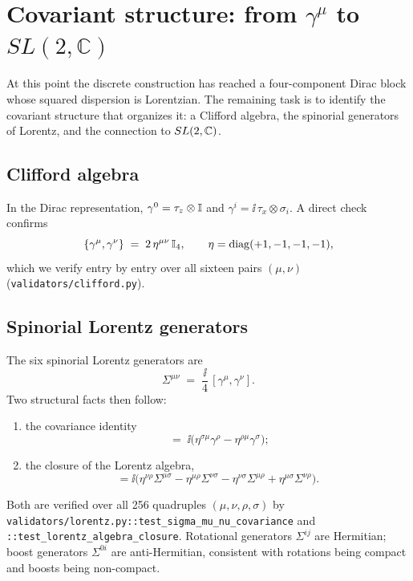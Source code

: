 \section{Covariant structure: from \texorpdfstring{$\gamma^{\mu}$}{gamma\^mu} to \texorpdfstring{$SL(2,\mathbb{C})$}{SL(2,C)}}
\label{p:covariant}

At this point the discrete construction has reached a four-component
Dirac block whose squared dispersion is Lorentzian. The remaining task
is to identify the covariant structure that organizes it: a Clifford
algebra, the spinorial generators of Lorentz, and the connection to
$SL(2,\mathbb{C})$.

\subsection{Clifford algebra}
In the Dirac representation, $\gamma^{0} = \tau_{z}\otimes\mathbb{I}$ and
$\gamma^{i} = \ii\,\tau_{x}\otimes\sigma_{i}$. A direct check confirms
\begin{equation}
\{\gamma^{\mu},\gamma^{\nu}\}\;=\;2\,\eta^{\mu\nu}\,\mathbb{I}_{4} ,
\qquad \eta=\mathrm{diag}(+1,-1,-1,-1) ,
\label{p:eq:clifford}
\end{equation}
which we verify entry by entry over all sixteen pairs $(\mu,\nu)$
(\texttt{validators/clifford.py}).

\subsection{Spinorial Lorentz generators}
The six spinorial Lorentz generators are
\begin{equation}
\Sigma^{\mu\nu} \;=\; \frac{\ii}{4}\,[\gamma^{\mu},\gamma^{\nu}] .
\end{equation}
Two structural facts then follow:
\begin{enumerate}[leftmargin=*]
\item the covariance identity
\begin{equation}
[\Sigma^{\rho\sigma},\,\gamma^{\mu}]
\;=\;\ii\bigl(\eta^{\sigma\mu}\gamma^{\rho}-\eta^{\rho\mu}\gamma^{\sigma}\bigr) ;
\label{p:eq:cov-id}
\end{equation}
\item the closure of the Lorentz algebra,
\begin{equation}
[\Sigma^{\mu\nu},\Sigma^{\rho\sigma}] = \ii\bigl(
  \eta^{\nu\rho}\Sigma^{\mu\sigma}-\eta^{\mu\rho}\Sigma^{\nu\sigma}
 -\eta^{\nu\sigma}\Sigma^{\mu\rho}+\eta^{\mu\sigma}\Sigma^{\nu\rho}\bigr).
\label{p:eq:lorentz-closure}
\end{equation}
\end{enumerate}
Both are verified over all 256 quadruples $(\mu,\nu,\rho,\sigma)$ by
\texttt{validators/lorentz.py::test\_sigma\_mu\_nu\_covariance} and
\texttt{::test\_lorentz\_algebra\_closure}. Rotational generators
$\Sigma^{ij}$ are Hermitian; boost generators $\Sigma^{0i}$ are
anti-Hermitian, consistent with rotations being compact and boosts being
non-compact.


